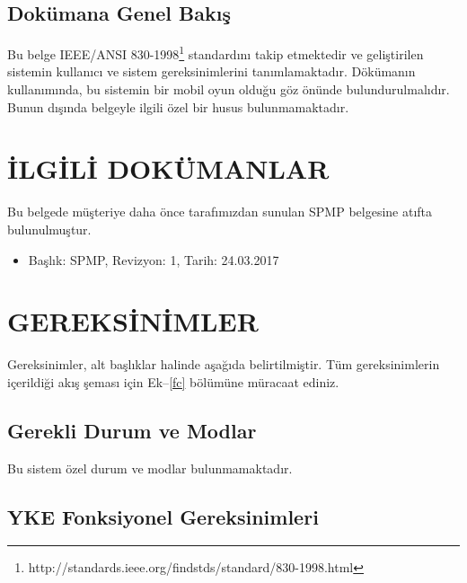 \documentclass[12pt,a4paper]{article}
\begin{document}
   \subsection{Dokümana Genel Bakış}
   Bu belge IEEE/ANSI 830-1998\footnote{http://standards.ieee.org/findstds/standard/830-1998.html} standardını takip etmektedir ve geliştirilen sistemin kullanıcı ve sistem gereksinimlerini tanımlamaktadır. Dökümanın kullanımında, bu sistemin bir mobil oyun olduğu göz önünde bulundurulmalıdır. Bunun dışında belgeyle ilgili özel bir husus bulunmamaktadır.

   \section{İLGİLİ DOKÜMANLAR}
   Bu belgede müşteriye daha önce tarafımızdan sunulan SPMP belgesine atıfta bulunulmuştur.
   \begin{itemize}
      \item Başlık: SPMP, Revizyon: 1, Tarih: 24.03.2017
   \end{itemize}

   \section{GEREKSİNİMLER}
   Gereksinimler, alt başlıklar halinde aşağıda belirtilmiştir. Tüm gereksinimlerin içerildiği akış şeması için Ek--\ref{fc} bölümüne müracaat ediniz.

   \subsection{Gerekli Durum ve Modlar}
   Bu sistem özel durum ve modlar bulunmamaktadır.

   \subsection{YKE Fonksiyonel Gereksinimleri} \label{ger}
\end{document}
